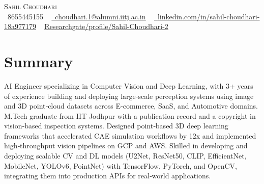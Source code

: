 \documentclass[letterpaper,11pt]{article}
\begin{document}

\begin{center}
    {\Huge \scshape Sahil Choudhari} \\ \vspace{1pt}
    \vspace{4pt}
    \small \raisebox{-0.1\height}\faPhone\ 8655445155 ~ \href{mailto:choudhari.1@iitj.ac.in}{\raisebox{-0.2\height}\faEnvelope\  \underline{choudhari.1@alumni.iitj.ac.in}} ~ 
    \href{https://linkedin.com/in/sahil-choudhari-18a977179}{\raisebox{-0.2\height}\faLinkedin\ \underline{linkedin.com/in/sahil-choudhari-18a977179}}  ~
    \vspace{5pt}
    \href{https://www.researchgate.net/profile/Sahil-Choudhari-2}{\raisebox{-0.2\height}\faResearchgate
    \underline{Researchgate/profile/Sahil-Choudhari-2}} ~
   
    
    \vspace{-1pt}
\end{center}
\vspace{-12pt}

\section{Summary}
AI Engineer specializing in Computer Vision and Deep Learning, with 3+ years of experience building and deploying large‑scale perception systems using image and 3D point‑cloud datasets across E‑commerce, SaaS, and Automotive domains. M.Tech graduate from IIT Jodhpur with a publication record and a copyright in vision‑based inspection systems. Designed point‑based 3D deep learning frameworks that accelerated CAE simulation workflows by 12x and implemented high‑throughput vision pipelines on GCP and AWS. Skilled in developing and deploying scalable CV and DL models (U2Net, ResNet50, CLIP, EfficientNet, MobileNet, YOLOv6, PointNet) with TensorFlow, PyTorch, and OpenCV, integrating them into production APIs for real‑world applications.
\end{document}

